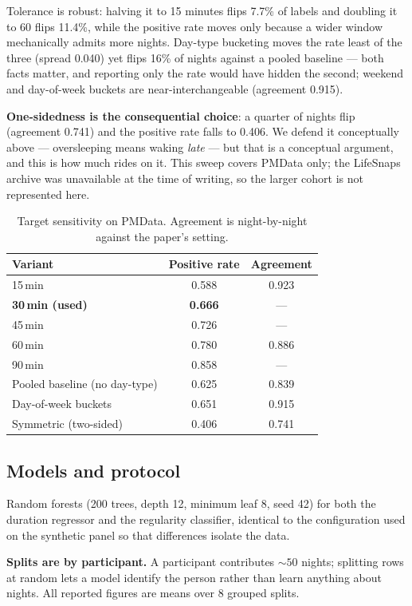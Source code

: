 \documentclass[conference]{IEEEtran}
\begin{document}
Tolerance is robust: halving it to 15 minutes flips 7.7\% of labels and doubling
it to 60 flips 11.4\%, while the positive rate moves only because a wider window
mechanically admits more nights. Day-type bucketing moves the rate least of the
three (spread 0.040) yet flips 16\% of nights against a pooled baseline --- both
facts matter, and reporting only the rate would have hidden the second;
weekend and day-of-week buckets are near-interchangeable (agreement 0.915).

\textbf{One-sidedness is the consequential choice}: a quarter of nights flip
(agreement 0.741) and the positive rate falls to 0.406. We defend it
conceptually above --- oversleeping means waking \emph{late} --- but that is a
conceptual argument, and this is how much rides on it. This sweep covers PMData
only; the LifeSnaps archive was unavailable at the time of writing, so the
larger cohort is not represented here.

\begin{table}[t]
\caption{Target sensitivity on PMData. Agreement is night-by-night against the
paper's setting.}
\label{tab:sens}
\centering
\small
\begin{tabular}{lcc}
\toprule
Variant & Positive rate & Agreement \\
\midrule
15\,min & 0.588 & 0.923 \\
\textbf{30\,min (used)} & \textbf{0.666} & --- \\
45\,min & 0.726 & --- \\
60\,min & 0.780 & 0.886 \\
90\,min & 0.858 & --- \\
\midrule
Pooled baseline (no day-type) & 0.625 & 0.839 \\
Day-of-week buckets & 0.651 & 0.915 \\
Symmetric (two-sided) & 0.406 & 0.741 \\
\bottomrule
\end{tabular}
\end{table}

\subsection{Models and protocol}

Random forests (200 trees, depth 12, minimum leaf 8, seed 42) for both the
duration regressor and the regularity classifier, identical to the configuration
used on the synthetic panel so that differences isolate the data.

\textbf{Splits are by participant.} A participant contributes ${\sim}50$ nights;
splitting rows at random lets a model identify the person rather than learn
anything about nights. All reported figures are means over 8 grouped splits.
\end{document}
